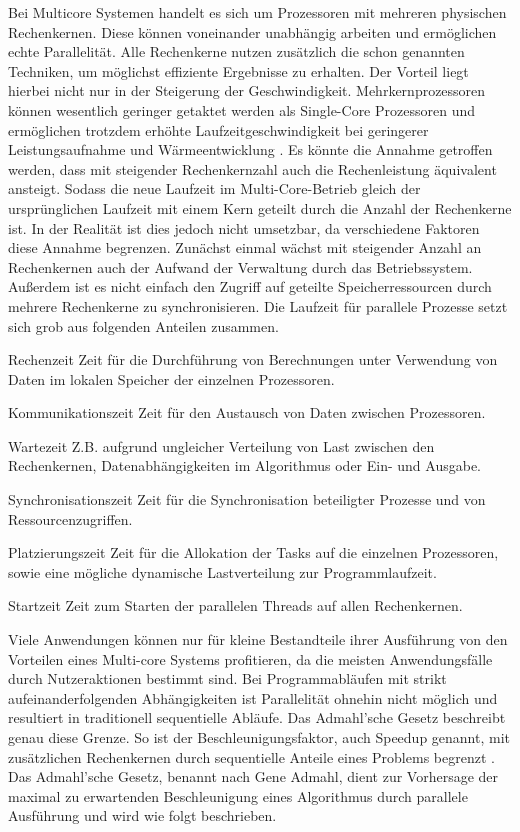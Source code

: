 Bei Multicore Systemen handelt es sich um Prozessoren mit mehreren physischen Rechenkernen. Diese können voneinander unabhängig arbeiten und ermöglichen echte Parallelität. Alle Rechenkerne nutzen zusätzlich die schon genannten Techniken, um möglichst effiziente Ergebnisse zu erhalten. Der Vorteil liegt hierbei nicht nur in der Steigerung der Geschwindigkeit. Mehrkernprozessoren können wesentlich geringer getaktet werden als Single-Core Prozessoren und ermöglichen trotzdem erhöhte Laufzeitgeschwindigkeit bei geringerer Leistungsaufnahme und Wärmeentwicklung \cite{MulicoreElektro}. Es könnte die Annahme getroffen werden, dass mit steigender Rechenkernzahl auch die Rechenleistung äquivalent ansteigt. Sodass die neue Laufzeit im Multi-Core-Betrieb gleich der ursprünglichen Laufzeit mit einem Kern geteilt durch die Anzahl der Rechenkerne ist. In der Realität ist dies jedoch nicht umsetzbar, da verschiedene Faktoren diese Annahme begrenzen. Zunächst einmal wächst mit steigender Anzahl an Rechenkernen auch der Aufwand der Verwaltung durch das Betriebssystem. Außerdem ist es nicht einfach den Zugriff auf geteilte Speicherressourcen durch mehrere Rechenkerne zu synchronisieren. Die Laufzeit für parallele Prozesse setzt sich grob aus folgenden Anteilen zusammen.
\begin{aligneddescription}
\item[Rechenzeit] Zeit für die Durchführung von Berechnungen unter Verwendung von Daten im lokalen Speicher der einzelnen Prozessoren.
\item[Kommunikationszeit] Zeit für den Austausch von Daten zwischen Prozessoren.
\item[Wartezeit] Z.B. aufgrund ungleicher Verteilung von Last zwischen den Rechenkernen, Datenabhängigkeiten im Algorithmus oder Ein- und Ausgabe.
\item[Synchronisationszeit] Zeit für die Synchronisation beteiligter Prozesse und von Ressourcenzugriffen.
\item[Platzierungszeit] Zeit für die Allokation der Tasks auf die einzelnen Prozessoren, sowie eine mögliche dynamische Lastverteilung zur Programmlaufzeit.
\item[Startzeit] Zeit zum Starten der parallelen Threads auf allen Rechenkernen.
\end{aligneddescription}\cite[313]{parallelBook}

Viele Anwendungen können nur für kleine Bestandteile ihrer Ausführung von den Vorteilen eines Multi-core Systems profitieren, da die meisten Anwendungsfälle durch Nutzeraktionen bestimmt sind. Bei Programmabläufen mit strikt aufeinanderfolgenden Abhängigkeiten ist Parallelität ohnehin nicht möglich und resultiert in traditionell sequentielle Abläufe. Das Admahl'sche Gesetz beschreibt genau diese Grenze. So ist der Beschleunigungsfaktor, auch Speedup genannt, mit zusätzlichen Rechenkernen durch sequentielle Anteile eines Problems begrenzt \cite[314]{parallelBook}. Das Admahl'sche Gesetz, benannt nach Gene Admahl, dient zur Vorhersage der maximal zu erwartenden Beschleunigung eines Algorithmus durch parallele Ausführung und wird wie folgt beschrieben.

